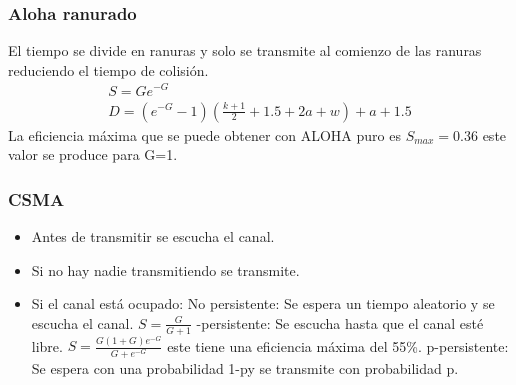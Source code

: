 \subsubsection{Aloha ranurado}
El tiempo se divide en ranuras y solo se transmite al comienzo de las ranuras reduciendo el tiempo de colisión.
\begin{align}
S=Ge^{-G}\\
D=(e^{-G}-1)(\frac{k+1}{2}+1.5+2a+w)+a+1.5
\end{align}
La eficiencia máxima que se puede obtener con ALOHA puro es $S_{max}=0.36$ este valor se produce para G=1.\\
\subsubsection{CSMA}
\begin{itemize}
\item Antes de transmitir se escucha el canal.
\item Si no hay nadie transmitiendo se transmite.
\item Si el canal está ocupado:
\subitem No persistente: Se espera un tiempo aleatorio y se escucha el canal. $S=\frac{G}{G+1}$
-persistente: Se escucha hasta que el canal esté libre. $S=\frac{G(1+G)e^{-G}}{G+e^{-G}}$ este tiene una eficiencia máxima del 55\%.
\subitem p-persistente: Se espera con una probabilidad 1-py se transmite con probabilidad p.
\end{itemize}
